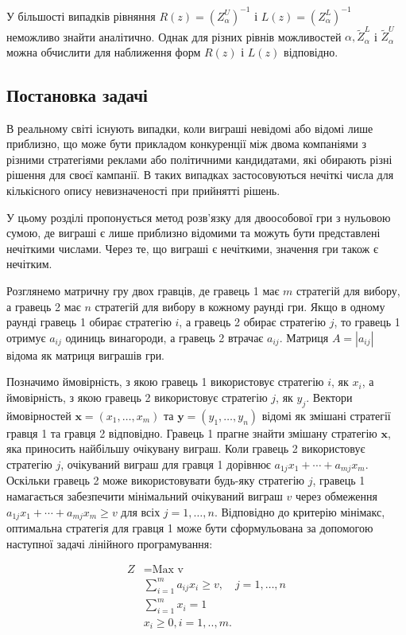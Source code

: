 \documentclass[14pt, a4paper, oneside]{extarticle}
\numberwithin{equation}{section}
\begin{document}
У більшості випадків рівняння $R(z)=\left(Z_{\alpha}^{U}\right)^{-1}$ і $L(z)=\left(Z_{\alpha}^{ L}\right)^{-1}$ неможливо знайти аналітично. Однак для різних рівнів можливостей $\alpha, \tilde{Z}_{\alpha}^{L}$ і $\tilde{Z}_{\alpha}^{U}$ можна обчислити для наближення форм $R(z)$ і $L(z)$ відповідно.

\subsection{Постановка задачі}
В реальному світі існують випадки, коли виграші невідомі або відомі лише приблизно, що може бути прикладом конкуренції між двома компаніями з різними стратегіями реклами або політичними кандидатами, які обирають різні рішення для своєї кампанії. В таких випадках застосовуються нечіткі числа для кількісного опису невизначеності при прийнятті рішень.

У цьому розділі пропонується метод розв'язку для двоособової гри з нульовою сумою, де виграші є лише приблизно відомими та можуть бути представлені нечіткими числами. Через те, що виграші є нечіткими, значення гри також є нечітким.

Розглянемо матричну гру двох гравців, де гравець 1 має $m$ стратегій для вибору, а гравець 2 має $n$ стратегій для вибору в кожному раунді гри. Якщо в одному раунді гравець 1 обирає стратегію $i$, а гравець 2 обирає стратегію $j$, то гравець 1 отримує $a_{i j}$ одиниць винагороди, а гравець 2 втрачає $a_{i j}$. Матриця $A=\left|a_{i j}\right|$ відома як матриця виграшів гри.

Позначимо ймовірність, з якою гравець 1 використовує стратегію $i$, як $x_{i}$, а ймовірність, з якою гравець 2 використовує стратегію $j$, як $y_{j}$. Вектори ймовірностей $\boldsymbol{x}=\left(x_{1}, \ldots, x_{m}\right)$ та $\boldsymbol{y}=\left(y_{1},\ldots, y_{n}\right)$ відомі як змішані стратегії гравця 1 та гравця 2 відповідно. Гравець 1 прагне знайти змішану стратегію $\boldsymbol{x}$, яка приносить найбільшу очікувану виграш. Коли гравець 2 використовує стратегію $j$, очікуваний виграш для гравця 1 дорівнює $a_{1 j} x_{1}+\cdots+a_{m j} x_{m}$. Оскільки гравець 2 може використовувати будь-яку стратегію $j$, гравець 1 намагається забезпечити мінімальний очікуваний виграш $v$ через обмеження $a_{1 j} x_{1}+\cdots+a_{m j} x_{m} \geq v$ для всіх $j=1, \ldots, n$. Відповідно до критерію мінімакс, оптимальна стратегія для гравця 1 може бути сформульована за допомогою наступної задачі лінійного програмування:

\begin{equation}
\begin{aligned}
Z &=\text{Max v} \\
& \sum_{i=1}^{m} a_{i j} x_{i} \geq v, \quad j=1, \ldots, n \\
& \sum_{i=1}^{m} x_{i}=1 \\
& x_{i} \geq 0, i=1, . ., m.
\end{aligned}
\end{equation}
\end{document}

